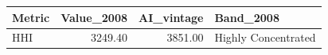 \begin{tabular}{lrrl}
\toprule
Metric & Value_2008 & AI_vintage & Band_2008 \\
\midrule
HHI & 3249.40 & 3851.00 & Highly Concentrated \\
\bottomrule
\end{tabular}
